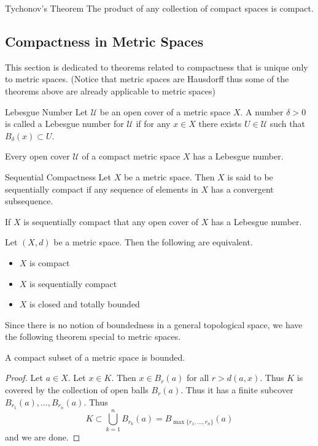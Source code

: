 \begin{thm}{Tychonov's Theorem}{} The product of any collection of compact spaces is compact. 
\end{thm}

\subsection{Compactness in Metric Spaces}
This section is dedicated to theorems related to compactness that is unique only to metric spaces. (Notice that metric spaces are Hausdorff thus some of the theorems above are already applicable to metric spaces)

\begin{defn}{Lebesgue Number}{} Let $\mathcal{U}$ be an open cover of a metric space $X$. A number $\delta>0$ is called a Lebesgue number for $\mathcal{U}$ if for any $x\in X$ there exists $U\in\mathcal{U}$ such that $B_\delta(x)\subset U$. 
\end{defn}

\begin{lmm}{}{} Every open cover $\mathcal{U}$ of a compact metric space $X$ has a Lebesgue number. 
\end{lmm}

\begin{defn}{Sequential Compactness}{} Let $X$ be a metric space. Then $X$ is said to be sequentially compact if any sequence of elements in $X$ has a convergent subsequence. 
\end{defn}

\begin{lmm}{}{} If $X$ is sequentially compact that any open cover of $X$ has a Lebesgue number. 
\end{lmm}

\begin{prp}{}{} Let $(X,d)$ be a metric space. Then the following are equivalent. 
\begin{itemize}
\item $X$ is compact
\item $X$ is sequentially compact
\item $X$ is closed and totally bounded
\end{itemize}
\end{prp}

Since there is no notion of boundedness in a general topological space, we have the following theorem special to metric spaces. 

\begin{prp}{}{} A compact subset of a metric space is bounded. \tcbline
\begin{proof}
Let $a\in X$. Let $x\in K$. Then $x\in B_r(a)$ for all $r>d(a,x)$. Thus $K$ is covered by the collection of open balls $B_r(a)$. Thus it has a finite subcover $B_{r_1}(a),\dots,B_{r_n}(a)$. Thus $$K\subset\bigcup_{k=1}^nB_{r_k}(a)=B_{\max\{r_1,\dots,r_n\}}(a)$$ and we are done. 
\end{proof}
\end{prp}

